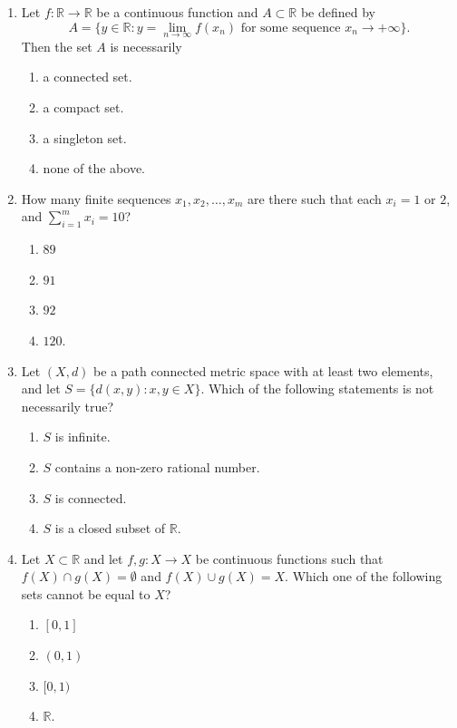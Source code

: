 \documentclass[11pt, a4paper]{article}
\begin{document}
\begin{enumerate}[resume]
  \item Let $f: \mathbb{R} \to \mathbb{R}$ be a continuous function and $A \subset \mathbb{R}$ be defined by
  \[
    A = \{y \in \mathbb{R} : y = \lim_{n \to \infty} f(x_n) \text{ for some sequence } x_n \to +\infty\}.
  \]
  Then the set $A$ is necessarily
  \begin{enumerate}[label=\Alph*.]
    \item a connected set.
    \item a compact set.
    \item a singleton set.
    \item none of the above.
  \end{enumerate}

  \item How many finite sequences $x_1, x_2, \dots, x_m$ are there such that each $x_i = 1$ or $2$, and $\sum_{i=1}^m x_i = 10$?
  \begin{enumerate}[label=\Alph*.]
    \item $89$
    \item $91$
    \item $92$
    \item $120$.
  \end{enumerate}

  \item Let $(X, d)$ be a path connected metric space with at least two elements, and let $S = \{d(x, y) : x, y \in X\}$. Which of the following statements is not necessarily true?
  \begin{enumerate}[label=\Alph*.]
    \item $S$ is infinite.
    \item $S$ contains a non-zero rational number.
    \item $S$ is connected.
    \item $S$ is a closed subset of $\mathbb{R}$.
  \end{enumerate}

  \item Let $X \subset \mathbb{R}$ and let $f, g: X \to X$ be continuous functions such that $f(X) \cap g(X) = \emptyset$ and $f(X) \cup g(X) = X$. Which one of the following sets cannot be equal to $X$?
  \begin{enumerate}[label=\Alph*.]
    \item $[0, 1]$
    \item $(0, 1)$
    \item $[0, 1)$
    \item $\mathbb{R}$.
  \end{enumerate}


\end{enumerate}
\end{document}
